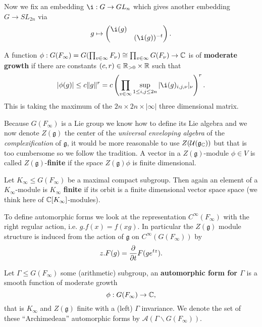 Now we fix an embedding \(\i : G\to GL_n\) which gives another embedding \(G\to SL_{2n}\) via
	\[g\mapsto \begin{pmatrix}
		\i (g) & \\
		 & (\i (g))^{-t}
	\end{pmatrix}.\]

	A function \(\phi : G(F_\infty) = G(\prod_{v\in\infty} F_\nu)\cong \prod_{v\in \infty}G(F_\nu) \to \C \) is of \textbf{moderate growth} if there are constants \((c,r)\in \R_{>0}\times \R\) such that 
	\[|\phi(g)| \leq c\norm{g}^r = c \left(\prod_{v\in\infty} \sup_{1\leq i, j\leq 2n} |\i (g)_{i,j, \nu}|_\nu\right)^r.\]
	This is taking the maximum of the \(2n\times 2n \times |\infty| \) three dimensional matrix. 

    Because \(G(F_\infty)\) is a Lie group we know how to define its Lie algebra and we now denote \(Z(\mathfrak{g})\) the center of the \textit{universal enveloping algebra} of the \textit{complexification} of \(\mathfrak{g}\), it would be more reasonable to use \(Z(\mathcal{U}(\mathfrak{g}_{\C}))\) but that is too cumbersome so we follow the tradition. 
    A vector in a \(Z(\mathfrak{g})\)-module \(\phi\in V\) is called \(Z(\mathfrak{g})\)-\textbf{finite} if the space \(Z(\mathfrak{g})\phi\) is finite dimensional. 

	Let \(K_\infty\leq G(F_\infty)\) be a maximal compact subgroup. Then again an element of a \(K_\infty\)-module is \(K_\infty\) \textbf{finite} if its orbit is a finite dimensional vector space space (we think here of \(\C[K_\infty]\)-modules).

	To define automorphic forms we look at the representation \(C^\infty(F_\infty)\) with the right regular action, i.e. \(g.f(x) = f(xg)\).  In particular the \(Z(\mathfrak{g})\) module structure is induced from the action of \(\mathfrak{g}\) on \(C^\infty(G(F_\infty))\) by \label{lie_algebra_action}
	\[z.F(g) = \frac{\partial }{\partial t}F(ge^{tz}).\] 

	\begin{Definition}
		Let \(\Gamma\leq G(F_\infty)\) some (arithmetic) subgroup, an \textbf{automorphic form for \(\Gamma\)} is a smooth function of moderate growth 
		\[\phi: G(F_\infty) \to \C,\]
		that is \(K_\infty\) and \(Z(\mathfrak{g})\) finite with a (left) \(\Gamma\) invariance. We denote the set of these ``Archimedean'' automorphic forms by \(\mathcal{A}(\Gamma \backslash G(F_\infty))\).
	\end{Definition}


